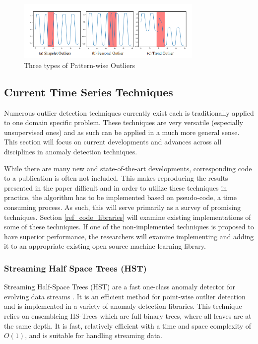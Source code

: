 \begin{figure}[H]
    \centering
    \includegraphics[width=0.8\textwidth]{Images/contextual_outliers_graphic.PNG}
    \caption{Three types of Pattern-wise Outliers \cite{lai2021revisiting}}
    \label{fig:contextual-outliers}
\end{figure}

\subsection{Current Time Series Techniques}
Numerous outlier detection techniques currently exist each is traditionally applied to one domain specific problem. These techniques are very versatile (especially unsupervised ones) and as such can be applied in a much more general sense. This section will focus on current developments and advances across all disciplines in anomaly detection techniques.

While there are many new and state-of-the-art developments, corresponding code to a publication is often not included. This makes reproducing the results presented in the paper difficult and in order to utilize these techniques in practice, the algorithm has to be implemented based on pseudo-code, a time consuming process. As such, this will serve primarily as a survey of promising techniques. Section \ref{ref_code_libraries} will examine existing implementations of some of these techniques. If one of the non-implemented techniques is proposed to have superior performance, the researchers will examine implementing and adding it to an appropriate existing open source machine learning library.

\subsubsection{Streaming Half Space Trees (HST)}
Streaming Half-Space Trees (HST) are a fast one-class anomaly detector for evolving data streams \cite{fast-anomaly-detection-streaming}. It is an efficient method for point-wise outlier detection and is implemented in a variety of anomaly detection libraries. This technique relies on ensembleing HS-Trees which are full binary trees, where all leaves are at the same depth. It is fast, relatively efficient with a time and space complexity of $O(1)$, and is suitable for handling streaming data.


